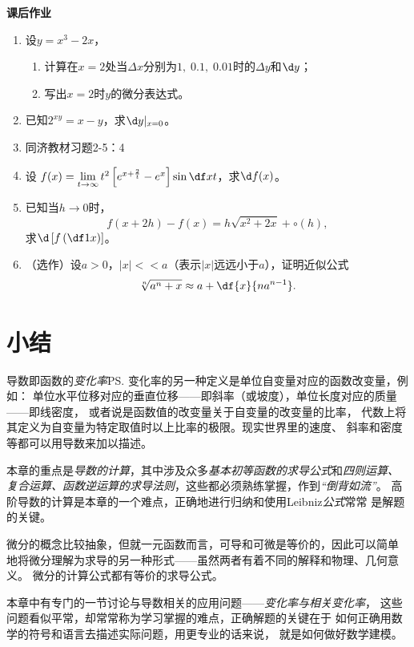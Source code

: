\begin{ext}
	{\centering\bf 课后作业}
	
	\begin{enumerate}  
	  \item 设$y=x^3-2x$，
	  \begin{enumerate}[(1)]
	    \item 计算在$x=2$处当$\Delta x$分别为$1,\;0.1,\;
	  	0.01$时的$\Delta y$和$\d y$；
	    \item 写出$x=2$时$y$的微分表达式。
	  \end{enumerate}
	  \item 已知$2^{xy}=x-y$，求$\d y|_{x=0}$。
	  \item 同济教材习题2-5：4
	  \item 设
	  $f(x)=\lim\limits_{t\to\infty}t^2
	  \left[e^{x+\frac2t}-e^x\right]\sin\df xt$，求$\d f(x)$。
	  \item 已知当$h\to 0$时，
	  $$f(x+2h)-f(x)=h\sqrt{x^2+2x}+\circ(h),$$
	  求$\d\left[f\left(\df1x\right)\right]$。
	  \item （选作）设$a>0$，$|x|<<a$（表示$|x|$远远小于$a$），证明近似公式
	  $$\sqrt[n]{a^n+x}\approx a+\df{x}{na^{n-1}}.$$
	\end{enumerate}
\end{ext}

\section{小结}

导数即函数的{\it 变化率}\ps{变化率的另一种定义是单位自变量对应的函数改变量，例如：
单位水平位移对应的垂直位移——即斜率（或坡度），单位长度对应的质量——即线密度}，
或者说是函数值的改变量关于自变量的改变量的比率，
代数上将其定义为自变量为特定取值时以上比率的极限。现实世界里的速度、
斜率和密度等都可以用导数来加以描述。

本章的重点是{\it 导数的计算}，其中涉及众多{\it 基本初等函数的求导公式}和{\it 四则运算、
复合运算、函数逆运算的求导法则}，这些都必须熟练掌握，作到{\it “倒背如流”}。
高阶导数的计算是本章的一个难点，正确地进行归纳和使用Leibniz{\it 公式}常常
是解题的关键。

微分的概念比较抽象，但就一元函数而言，可导和可微是等价的，因此可以简单
地将微分理解为求导的另一种形式——虽然两者有着不同的解释和物理、几何意义。
微分的计算公式都有等价的求导公式。

本章中有专门的一节讨论与导数相关的应用问题——{\it 变化率与相关变化率}，
这些问题看似平常，却常常称为学习掌握的难点，正确解题的关键在于
如何正确用数学的符号和语言去描述实际问题，用更专业的话来说，
就是如何做好数学建模。

